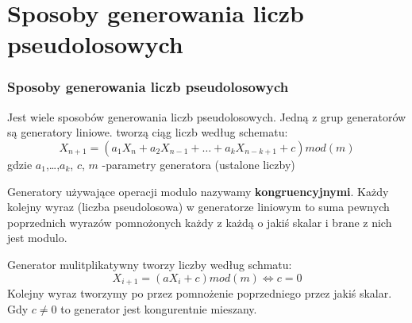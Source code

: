 \documentclass[9pt]{beamer}
\begin{document}
\section{Sposoby generowania liczb pseudolosowych}
\begin{frame}
  \frametitle{Sposoby generowania liczb pseudolosowych}
  Jest wiele sposobów generowania liczb pseudolosowych. Jedną z grup generatorów są generatory liniowe. tworzą ciąg liczb według schematu:
  \begin{equation*}
    X_{n+1}= (a_1X_n+a_2X_{n-1}+\ldots+a_kX_{n-k+1}+c)mod(m)
  \end{equation*}
  gdzie $a_1$,\ldots,$a_k$, $c$, $m$ -parametry generatora (ustalone liczby)

  Generatory używające operacji modulo nazywamy \textbf{kongruencyjnymi}. Każdy kolejny wyraz (liczba pseudolosowa) w generatorze liniowym to suma pewnych poprzednich wyrazów pomnożonych każdy z każdą o jakiś skalar i brane z nich jest modulo. 
  
  Generator mulitplikatywny tworzy liczby według schmatu:
  \begin{equation*}
    X_{i+1}=(aX_{i}+c)mod(m) \iff c=0
  \end{equation*}
Kolejny wyraz tworzymy po przez pomnożenie poprzedniego przez jakiś skalar. Gdy $c \neq  0$ to generator jest kongurentnie mieszany.
\end{frame}
\end{document}
